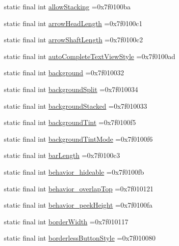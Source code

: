 \begin{DoxyCompactItemize}
\item 
static final int \hyperlink{classproject4_1_1xaria_1_1R_1_1attr_ab8dd03d6eb82f4fadf1004ce71f1ce3a}{allow\+Stacking} =0x7f0100ba
\item 
static final int \hyperlink{classproject4_1_1xaria_1_1R_1_1attr_a78f35c1e88a4c101ec8ba404897db388}{arrow\+Head\+Length} =0x7f0100c1
\item 
static final int \hyperlink{classproject4_1_1xaria_1_1R_1_1attr_a3f9b21113512340bb29a60b45088efb6}{arrow\+Shaft\+Length} =0x7f0100c2
\item 
static final int \hyperlink{classproject4_1_1xaria_1_1R_1_1attr_a5e3ba4c5b79f55478820c97dd8a72ea7}{auto\+Complete\+Text\+View\+Style} =0x7f0100ad
\item 
static final int \hyperlink{classproject4_1_1xaria_1_1R_1_1attr_adf477a84cb6f593e955bd713a08db04e}{background} =0x7f010032
\item 
static final int \hyperlink{classproject4_1_1xaria_1_1R_1_1attr_acfe528f122298887ad04e87f1121e268}{background\+Split} =0x7f010034
\item 
static final int \hyperlink{classproject4_1_1xaria_1_1R_1_1attr_a70c96990ebbe4cf4f6717710797b8703}{background\+Stacked} =0x7f010033
\item 
static final int \hyperlink{classproject4_1_1xaria_1_1R_1_1attr_ac740debdf11f54d52dedda24c14beaa3}{background\+Tint} =0x7f0100f5
\item 
static final int \hyperlink{classproject4_1_1xaria_1_1R_1_1attr_a17bbcc43fe1098896481231e78ea4168}{background\+Tint\+Mode} =0x7f0100f6
\item 
static final int \hyperlink{classproject4_1_1xaria_1_1R_1_1attr_a01400ab5569fe32a1b367eb6dc3a1c46}{bar\+Length} =0x7f0100c3
\item 
static final int \hyperlink{classproject4_1_1xaria_1_1R_1_1attr_ae583986bc4ae618babdbb0e597fde220}{behavior\+\_\+hideable} =0x7f0100fb
\item 
static final int \hyperlink{classproject4_1_1xaria_1_1R_1_1attr_aed17641ca0c9bd7043daece4ff69fec6}{behavior\+\_\+overlap\+Top} =0x7f010121
\item 
static final int \hyperlink{classproject4_1_1xaria_1_1R_1_1attr_adc8d3fb6f24ec356316051d935327807}{behavior\+\_\+peek\+Height} =0x7f0100fa
\item 
static final int \hyperlink{classproject4_1_1xaria_1_1R_1_1attr_aaec248df20502e6356eb4de802b96e5e}{border\+Width} =0x7f010117
\item 
static final int \hyperlink{classproject4_1_1xaria_1_1R_1_1attr_acfd93ffef2c94e2f3c2b9922c3c04ef9}{borderless\+Button\+Style} =0x7f010080

\end{DoxyCompactItemize}
